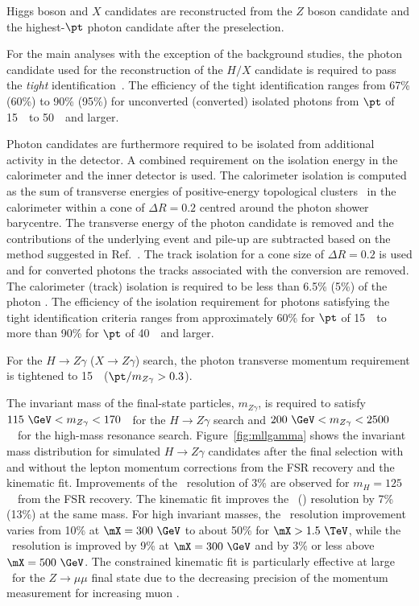 Higgs boson and $X$ candidates are reconstructed from the $Z$ boson candidate and the highest-$\pt$
photon candidate after the preselection.

For the main analyses with the exception of the background studies, the photon candidate used for the 
reconstruction of the $H/X$ candidate is required to pass the \textit{tight} identification~\cite{Aaboud:2016yuq}. 
The efficiency of the tight identification ranges from 67\% (60\%) to 90\% (95\%)
for unconverted (converted) isolated photons from $\pt$ of 15~\GeV\ to 50~\GeV\ and larger.

Photon candidates are furthermore required 
to be isolated from additional activity in the detector. A combined requirement
on the isolation energy in the calorimeter and the inner detector is used. The calorimeter isolation is
computed as the sum of transverse energies of positive-energy topological 
clusters~\cite{Aad:2016upy} in the calorimeter within a cone of $\Delta R =  0.2$ centred around 
the photon shower barycentre. The transverse energy of the photon
candidate is removed and the contributions of the underlying event and pile-up are subtracted based on
the method suggested in Ref.~\cite{Cacciari:2009dp}. The track isolation for a cone size of 
$\Delta R =0.2$ is used and for converted photons the tracks associated with the
conversion are removed. The calorimeter (track) isolation
is required to be less than 6.5\% (5\%) of the photon \pt.
The efficiency of the isolation requirement for photons satisfying the tight identification criteria 
ranges from approximately 60\% for $\pt$ of 15~\GeV\ to more than 90\% for $\pt$ of 40~\GeV\ 
and larger.

For the $H\to Z\gamma$ ($X\to Z\gamma$) search, the photon transverse momentum requirement is tightened to 15~\GeV\
($\pt / m_{Z\gamma} > 0.3$).
  
The invariant mass of the final-state 
particles, $m_{Z\gamma}$, is 
required to satisfy $115~\GeV < m_{Z\gamma} < 170$~\GeV\ for the $H\to Z\gamma$ search 
and $200~\GeV < m_{Z\gamma} < 2500$~\GeV\ for the high-mass resonance search.
Figure~\ref{fig:mllgamma} shows the invariant 
mass distribution for simulated $H\to Z\gamma$ candidates after the final selection
 with and without the lepton momentum 
corrections from the FSR recovery and the kinematic fit. 
Improvements of the \mmmg\ resolution of 3\% are observed for $m_H=125$~\GeV\ from the FSR
recovery.
The kinematic fit improves the \mmmg\ (\meeg) resolution by 7\% (13\%) at the same mass.
For high invariant masses, the \mmmg\ resolution improvement varies from 10\% at 
$\mX=300~\GeV$ to about 50\% for $\mX > 1.5~\TeV$, while the \meeg\ resolution is
improved by 9\% at $\mX=300~\GeV$ and by 3\% or less above $\mX = 500~\GeV$.
The constrained kinematic fit is particularly effective at large
\mX\ for the $Z\to\mu\mu$ final state due to the decreasing precision of the momentum 
measurement for increasing muon \pt.


